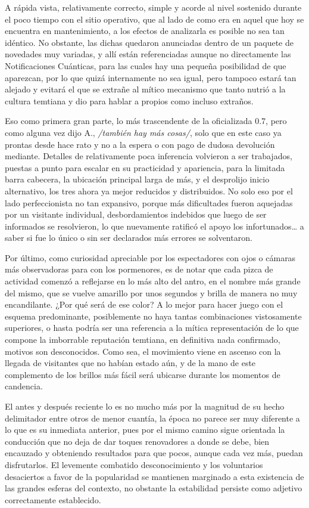 \documentclass[
]{book}
\begin{document}
A rápida vista, relativamente correcto, simple y acorde al nivel sostenido durante el poco tiempo con el sitio operativo, que al lado de como era en aquel que hoy se encuentra en mantenimiento, a los efectos de analizarla es posible no sea tan idéntico. No obstante, las dichas quedaron anunciadas dentro de un paquete de novedades muy variadas, y allí están referenciadas aunque no directamente las Notificaciones Cuánticas, para las cuales hay una pequeña posibilidad de que aparezcan, por lo que quizá internamente no sea igual, pero tampoco estará tan alejado y evitará el que se extrañe al mítico mecanismo que tanto nutrió a la cultura temtiana y dio para hablar a propios como incluso extraños.

Eso como primera gran parte, lo más trascendente de la oficializada 0.7, pero como alguna vez dijo A., \emph{/también hay más cosas/}, solo que en este caso ya prontas desde hace rato y no a la espera o con pago de dudosa devolución mediante. Detalles de relativamente poca inferencia volvieron a ser trabajados, puestas a punto para escalar en su practicidad y apariencia, para la limitada barra cabecera, la ubicación principal larga de más, y el desprolijo inicio alternativo, los tres ahora ya mejor reducidos y distribuidos. No solo eso por el lado perfeccionista no tan expansivo, porque más dificultades fueron aquejadas por un visitante individual, desbordamientos indebidos que luego de ser informados se resolvieron, lo que nuevamente ratificó el apoyo los infortunados\ldots{} a saber si fue lo único o sin ser declarados más errores se solventaron.

Por último, como curiosidad apreciable por los espectadores con ojos o cámaras más observadoras para con los pormenores, es de notar que cada pizca de actividad comenzó a reflejarse en lo más alto del antro, en el nombre más grande del mismo, que se vuelve amarillo por unos segundos y brilla de manera no muy encandilante. ¿Por qué será de ese color? A lo mejor para hacer juego con el esquema predominante, posiblemente no haya tantas combinaciones vistosamente superiores, o hasta podría ser una referencia a la mítica representación de lo que compone la imborrable reputación temtiana, en definitiva nada confirmado, motivos son desconocidos. Como sea, el movimiento viene en ascenso con la llegada de visitantes que no habían estado aún, y de la mano de este complemento de los brillos más fácil será ubicarse durante los momentos de candencia.

El antes y después reciente lo es no mucho más por la magnitud de su hecho delimitador entre otros de menor cuantía, la época no parece ser muy diferente a lo que es su inmediata anterior, pues por el mismo camino sigue orientada la conducción que no deja de dar toques renovadores a donde se debe, bien encauzado y obteniendo resultados para que pocos, aunque cada vez más, puedan disfrutarlos. El levemente combatido desconocimiento y los voluntarios desaciertos a favor de la popularidad se mantienen marginado a esta existencia de las grandes esferas del contexto, no obstante la estabilidad persiste como adjetivo correctamente establecido.
\end{document}
